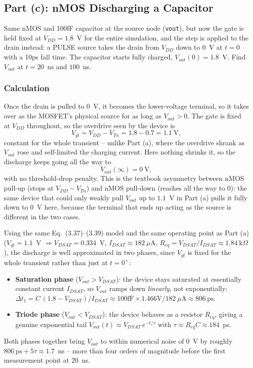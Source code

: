 \subsection{Part (c): nMOS Discharging a Capacitor}

Same nMOS and 100fF capacitor at the source node (\texttt{vout}), but now the gate is held fixed at $V_{DD}=1.8$~V for the entire simulation, and the step is applied to the drain instead: a PULSE source takes the drain from $V_{DD}$ down to $0$~V at $t=0$ with a 10ps fall time. The capacitor starts fully charged, $V_{out}(0)=1.8$~V. Find $V_{out}$ at $t=20$~ns and $100$~ns.

\subsubsection{Calculation}

Once the drain is pulled to $0$~V, it becomes the lower-voltage terminal, so it takes over as the MOSFET's physical source for as long as $V_{out}>0$. The gate is fixed at $V_{DD}$ throughout, so the overdrive seen by the device is
\[
V_{gt} = V_{DD} - V_{Tn} = 1.8 - 0.7 = 1.1\ \text{V},
\]
constant for the whole transient -- unlike Part (a), where the overdrive shrank as $V_{out}$ rose and self-limited the charging current. Here nothing shrinks it, so the discharge keeps going all the way to
\[
V_{out}(\infty) = 0\ \text{V},
\]
with no threshold-drop penalty. This is the textbook asymmetry between nMOS pull-up (stops at $V_{DD}-V_{Tn}$) and nMOS pull-down (reaches all the way to $0$): the same device that could only weakly pull $V_{out}$ up to $1.1$~V in Part (a) pulls it fully down to $0$~V here, because the terminal that ends up acting as the source is different in the two cases.

Using the same Eq.~(3.37)--(3.39) model and the same operating point as Part (a) ($V_{gt}=1.1$~V $\Rightarrow V_{DSAT}=0.334$~V, $I_{DSAT}\approx182\ \mu\text{A}$, $R_{eq}=V_{DSAT}/I_{DSAT}\approx1.84\ \text{k}\Omega$), the discharge is well approximated in two phases, since $V_{gt}$ is fixed for the whole transient rather than just at $t=0^+$:
\begin{itemize}
  \item \textbf{Saturation phase} ($V_{out}>V_{DSAT}$): the device stays saturated at essentially constant current $I_{DSAT}$, so $V_{out}$ ramps down \emph{linearly}, not exponentially: $\Delta t_1 = C\,(1.8-V_{DSAT})/I_{DSAT} \approx 100\text{fF}\times1.466\text{V}/182\ \mu\text{A}\approx806\ \text{ps}$.
  \item \textbf{Triode phase} ($V_{out}<V_{DSAT}$): the device behaves as a resistor $R_{eq}$, giving a genuine exponential tail $V_{out}(t)\approx V_{DSAT}\,e^{-t/\tau}$ with $\tau\approx R_{eq}C\approx184$~ps.
\end{itemize}
Both phases together bring $V_{out}$ to within numerical noise of $0$~V by roughly $806\ \text{ps} + 5\tau \approx 1.7$~ns -- more than four orders of magnitude before the first measurement point at $20$~ns.

